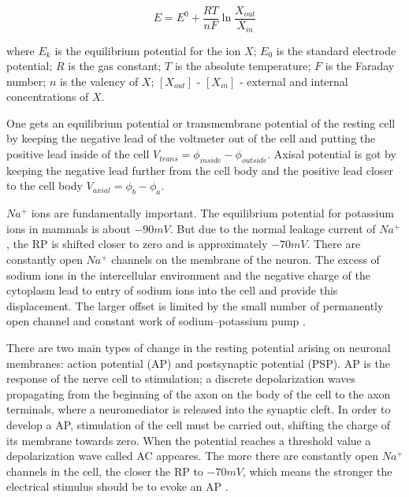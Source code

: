\documentclass[14pt,a4paper]{scrartcl}
\begin{document}
\begin{equation}
E = E^{0} + {\frac{RT}{nF}}\ln{\frac{X_{out}}{X_{in}}}
\end{equation}

where $E_k$ is the equilibrium potential for the ion $X$; $E_0$ is the standard electrode potential; $R$ is the gas constant; $T$ is the absolute temperature; $F$ is the Faraday number; $n$ is the valency of $X$; $[X_{out}]$ - $[X_{in}]$ - external and internal concentrations of $X$.

One gets an equilibrium potential or transmembrane potential of the resting cell by keeping the negative lead of the voltmeter out of the cell and putting the positive lead inside of the cell $V_{trans} = \phi_{inside} - \phi_{outside}$. Axisal potential is got by keeping the negative lead further from the cell body and the positive lead closer to the cell body $V_{axial} = \phi_{b} - \phi_{a}$.

$Na^{+}$ ions are fundamentally important. The equilibrium potential for potassium ions in mammals is about $-90 mV$. But due to the normal leakage current of $Na^{+}$, the RP is shifted closer to zero and is approximately $-70 mV$. There are constantly open $Na^{+}$ channels on the membrane of the neuron. The excess of sodium ions in the intercellular environment and the negative charge of the cytoplasm lead to entry of sodium ions into the cell and provide this displacement. The larger offset is limited by the small number of permanently open channel and constant work of sodium–potassium pump \cite{Purves2004}. 

There are two main types of change in the resting potential arising on neuronal membranes: action potential (AP) and postsynaptic potential (PSP). AP is the response of the nerve cell to stimulation; a discrete depolarization waves propagating from the beginning of the axon on the body of the cell to the axon terminals, where a neuromediator is released into the synaptic cleft. In order to develop a AP, stimulation of the cell must be carried out, shifting the charge of its membrane towards zero. When the potential reaches a threshold value a depolarization wave called AC appeares. The more there are constantly open $Na^{+}$ channels in the cell, the closer the RP to $-70 mV$, which means the stronger the electrical stimulus should be to evoke an AP \cite{Purves2004}.
\end{document}
